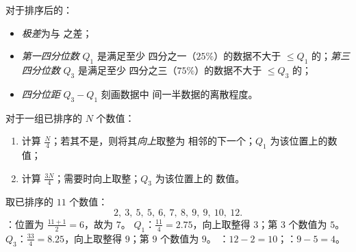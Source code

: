 \begin{definition}[极差、四分位数]\label{def:g10:stats:quartiles}
对于排序后的：
\begin{itemize}
  \item \emph{极差}为与
        之差；
  \item \emph{第一四分位数} $Q_1$ 是满足至少
        四分之一（$25\%$）的数据不大于
        $\leq Q_1$ 的；\emph{第三四分位数} $Q_3$ 是满足至少
        四分之三（$75\%$）的数据不大于
        $\leq Q_3$ 的；
  \item \emph{四分位距} $Q_3 - Q_1$ 刻画数据中
        间一半数据的离散程度。
\end{itemize}
\end{definition}

\begin{method}[求四分位数]\label{met:g10:stats:quartiles}
对于一组已排序的 $N$ 个数值：
\begin{enumerate}
  \item 计算 $\frac N4$；若其不是，则将其\emph{向上}取整为
        相邻的下一个；$Q_1$ 为该位置上的数值；
  \item 计算 $\frac{3N}{4}$；需要时向上取整；$Q_3$ 为该位置上的
        数值。
\end{enumerate}
\end{method}

\begin{example}\label{ex:g10:stats:quartiles}
取已排序的 $11$ 个数值：
\[
2,\ 3,\ 5,\ 5,\ 6,\ 7,\ 8,\ 9,\ 9,\ 10,\ 12 .
\]
：位置为 $\frac{11+1}{2} = 6$，故为 $7$。
$Q_1$：$\frac{11}{4} = 2.75$，向上取整得 $3$；第 $3$ 个数值为 $5$。
$Q_3$：$\frac{33}{4} = 8.25$，向上取整得 $9$；第 $9$ 个数值为 $9$。
：$12 - 2 = 10$；：$9 - 5 = 4$。
\end{example}

